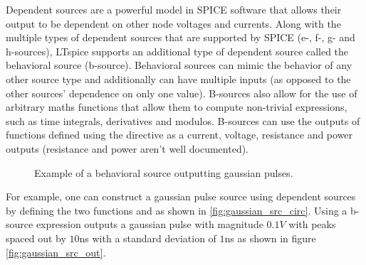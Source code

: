 Dependent sources are a powerful model in SPICE software that allows their output to be
dependent on other node voltages and currents. Along with the multiple types
of dependent sources that are supported by SPICE (e-, f-, g- and h-sources), LTspice
supports an additional type of dependent source called the behavioral source (b-source).
Behavioral sources can mimic the behavior of any other source type and additionally
can have multiple inputs (as opposed to the other sources' dependence on only one value).
B-sources also allow for the use of arbitrary maths functions that allow them to compute
non-trivial expressions, such as time integrals, derivatives and modulos.
B-sources can use the outputs of functions defined using the  directive
as a current, voltage, resistance and power outputs (resistance and power aren't well 
documented). 

\begin{figure}
    \centering
    \caption{Example of a behavioral source outputting gaussian pulses.}
\end{figure}

For example, one can construct a gaussian pulse source using dependent sources
by defining the two functions  and  as shown in 
\ref{fig:gaussian_src_circ}.
Using a b-source expression 
outputs a gaussian pulse with magnitude $0.1V$ with peaks
spaced out by $10$ns with a standard deviation of $1$ns as shown in figure
\ref{fig:gaussian_src_out}. 

